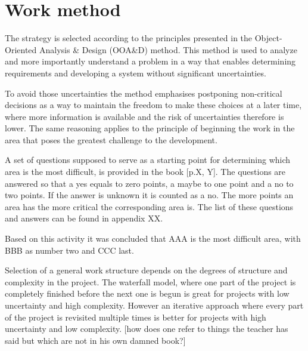 \section{Work method}
The strategy is selected according to the principles presented in the Object-Oriented Analysis \& Design (OOA\&D) method.
This method is used to analyze and more importantly understand a problem in a way that enables determining requirements and developing a system without significant uncertainties.

To avoid those uncertainties the method emphasises postponing non-critical decisions as a way to maintain the freedom to make these choices at a later time, where more information is available and the risk of uncertainties therefore is lower.
The same reasoning applies to the principle of beginning the work in the area that poses the greatest challenge to the development.

A set of questions supposed to serve as a starting point for determining which area is the most difficult, is provided in the book [p.X, Y].
The questions are answered so that a yes equals to zero points, a maybe to one point and a no to two points. %
If the answer is unknown it is counted as a no. The more points an area has the more critical the corresponding area is. The list of these questions and answers can be found in appendix XX.

Based on this activity it was concluded that AAA is the most difficult area, with BBB as number two and CCC last.

Selection of a general work structure depends on the degrees of structure and complexity in the project. The waterfall model, where one part of the project is completely finished before the next one is begun is great for projects with low uncertainty and high complexity. However an iterative approach where every part of the project is revisited  multiple times is better for projects with high uncertainty and low complexity. [how does one refer to things the teacher has said but which are not in his own damned book?] %


